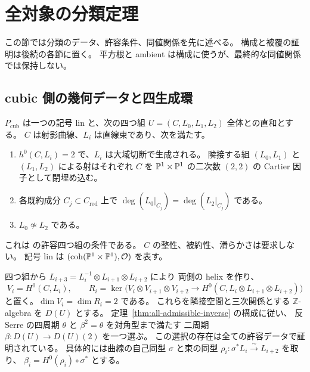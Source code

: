 \section{全対象の分類定理}
\label{sec:classification}

この節では分類のデータ、許容条件、同値関係を先に述べる。
構成と被覆の証明は後続の各節に置く。
平方根と ambient は構成に使うが、最終的な同値関係では保持しない。

\subsection{cubic 側の幾何データと四生成環}

\begin{definition}[許容四つ組]
\label{def:classification-admissible}
$P_{\mathrm{cub}}$ は一つの記号 $\mathrm{lin}$ と、次の四つ組
$U=(C,L_0,L_1,L_2)$ 全体との直和とする。
$C$ は射影曲線、$L_i$ は直線束であり、次を満たす。
\begin{enumerate}[label=(D\arabic*)]
\item $h^0(C,L_i)=2$ で、$L_i$ は大域切断で生成される。
      隣接する組 $(L_0,L_1)$ と $(L_1,L_2)$ による射はそれぞれ
      $C$ を $\mathbb P^1\times\mathbb P^1$ の二次数 $(2,2)$ の Cartier 因子として閉埋め込む。
\item 各既約成分 $C_j\subset C_{\mathrm{red}}$ 上で
      $\deg(L_0|_{C_j})=\deg(L_2|_{C_j})$ である。
\item $L_0\not\simeq L_2$ である。
\end{enumerate}
これは \cite[arXiv v3, Proposition 5.1.2]{VdB2011} の許容四つ組の条件である。
$C$ の整性、被約性、滑らかさは要求しない。
記号 $\mathrm{lin}$ は $(\operatorname{coh}(\mathbb P^1\times\mathbb P^1),\mathcal O)$ を表す。
\end{definition}

四つ組から $L_{i+3}=L_i^{-1}\otimes L_{i+1}\otimes L_{i+2}$ により
両側の helix を作り、
\[
 V_i=H^0(C,L_i),\qquad
 R_i=\ker\bigl(V_i\otimes V_{i+1}\otimes V_{i+2}
       \longrightarrow H^0(C,L_i\otimes L_{i+1}\otimes L_{i+2})\bigr)
\]
と置く。$\dim V_i=\dim R_i=2$ である。
これらを隣接空間と三次関係とする $\mathbb Z$-algebra を $D(U)$ とする。
定理~\ref{thm:all-admissible-inverse} の構成に従い、
反 Serre の四周期 $\theta$ と $\beta^2=\theta$ を対角型まで満たす
二周期 $\beta:D(U)\to D(U)(2)$ を一つ選ぶ。
この選択の存在は全ての許容データで証明されている。
具体的には曲線の自己同型 $\sigma$ と束の同型
$\rho_i:\sigma^*L_i\xrightarrow\sim L_{i+2}$ を取り、
$\beta_i=H^0(\rho_i)\circ\sigma^*$ とする。

